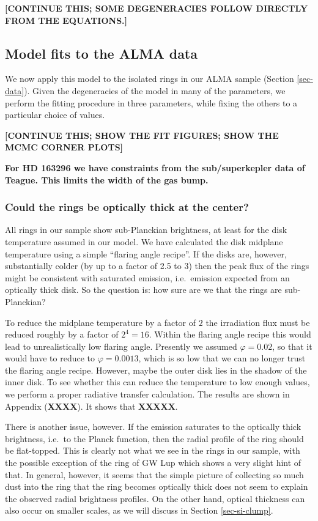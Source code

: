 \documentclass{aa}
\begin{document}
{\bf [CONTINUE THIS; SOME DEGENERACIES FOLLOW DIRECTLY FROM THE EQUATIONS.]}


\subsection{Model fits to the ALMA data}
\label{sec-anmodel-fits-to-data}
%
We now apply this model to the isolated rings in our ALMA sample (Section
\ref{sec-data}). Given the degeneracies of the model in many of the parameters,
we perform the fitting procedure in three parameters, while fixing the others
to a particular choice of values. 



{\bf [CONTINUE THIS; SHOW THE FIT FIGURES; SHOW THE MCMC CORNER PLOTS]}




{\bf For HD 163296 we have constraints from the sub/superkepler data of
Teague. This limits the width of the gas bump.}





\subsubsection{Could the rings be optically thick at the center?}
\label{sec-anmodel-fits-optically-thick}
%
All rings in our sample show sub-Planckian brightness, at least for the disk
temperature assumed in our model. We have calculated the disk midplane temperature
using a simple ``flaring angle recipe''. If the disks are, however, substantially
colder (by up to a factor of 2.5 to 3) then the peak flux of the rings might be
consistent with saturated emission, i.e.\ emission expected from an optically thick
disk. So the question is: how sure are we that the rings are sub-Planckian? 

To reduce the midplane temperature by a factor of $2$ the irradiation flux must
be reduced roughly by a factor of $2^4=16$. Within the flaring angle recipe this
would lead to unrealistically low flaring angle. Presently we assumed $\varphi=0.02$,
so that it would have to reduce to $\varphi=0.0013$, which is so low that we can no
longer trust the flaring angle recipe. However, maybe the outer disk lies in the
shadow of the inner disk. To see whether this can reduce the temperature to low
enough values, we perform a proper radiative transfer calculation. The results are
shown in Appendix ({\bf XXXX}). It shows that {\bf XXXXX}.

There is another issue, however. If the emission saturates to the optically thick
brightness, i.e.\ to the Planck function, then the radial profile of the ring should
be flat-topped. This is clearly not what we see in the rings in our sample, with
the possible exception of the ring of GW Lup which shows a very slight hint of that.
In general, however, it seems that the simple picture of collecting so much dust into
the ring that the ring becomes optically thick does not seem to explain the observed
radial brightness profiles. On the other hand, optical thickness can also occur
on smaller scales, as we will discuss in Section \ref{sec-si-clump}.
\end{document}
